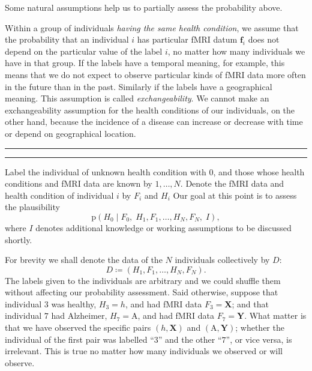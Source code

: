 \documentclass[\ifafour a4paper,12pt,\else a5paper,10pt,\fi%
onecolumn,oneside,article,%
british%
]{memoir}
\theoremstyle{remark}
\theoremstyle{innote}
\newcommand*{\defd}{\coloneqq}
\newcommand*{\pf}{\mathrm{p}}%
\renewcommand*{\|}{\mathpunct{|}}
\newcommand*{\sect}{\S}%
\newcommand*{\yH}{H}
\newcommand*{\yh}{h}
\newcommand*{\yD}{D}
\newcommand*{\yF}{F}
\newcommand*{\yf}{\bm{f}}
\newcommand*{\ya}{\mathrm{A}}
\newcommand*{\yI}{I}
\theoremstyle{plain}
\begin{document}
Some natural assumptions help us to partially assess the probability above.

Within a group of individuals \emph{having the same health condition}, we
assume that the probability that an individual $i$ has particular fMRI
datum $\yf_i$ does not depend on the particular value of the label $i$, no
matter how many individuals we have in that group. If the labels have a
temporal meaning, for example, this means that we do not expect to observe
particular kinds of fMRI data more often in the future than in the past.
Similarly if the labels have a geographical meaning. This assumption is
called \emph{exchangeability}. We cannot make an exchangeability assumption
for the health conditions of our individuals, on the other hand, because
the incidence of a disease can increase or decrease with time or depend on
geographical location.

\parencites[\sect~3]{diaconisetal1990}[\sect~4.6]{bernardoetal1994_r2000}

\bigskip\hrule\par\smallskip\par\hrule\bigskip

Label the individual of unknown health condition with $0$, and those whose
health conditions and fMRI data are known by $1, \dotsc, N$. Denote the
fMRI data and health condition of individual $i$ by $\yF_i$ and $\yH_i$ Our
goal at this point is to assess the plausibility
\begin{equation}
  \label{eq:goal_1st_simple}
  \pf(\yH_0 \| \yF_0,\; \yH_1,\yF_1, \dotsc, \yH_N, \yF_N,\; \yI),
\end{equation}
where $\yI$ denotes additional knowledge or working assumptions to be
discussed shortly.

For brevity we shall denote the data of the $N$
individuals collectively by $\yD$:
\begin{equation}
  \label{eq:collective_data_D}
  D \defd (\yH_1,\yF_1, \dotsc, \yH_N, \yF_N).
\end{equation}
The labels given to the individuals are arbitrary and we could shuffle them
without affecting our probability assessment. Said otherwise, suppose that
individual $3$ was healthy, $\yH_3=\yh$, and had fMRI data $\yF_3=\bm{X}$;
and that individual $7$ had Alzheimer, $\yH_7=\ya$, and had fMRI data
$\yF_7=\bm{Y}$. What matter is that we have observed the specific pairs
$(\yh,\bm{X})$ and $(\ya,\bm{Y})$; whether the individual of the first pair
was labelled \enquote{$3$} and the other \enquote{$7$}, or vice versa, is
irrelevant. This is true no matter how many individuals we observed or will
observe.
\end{document}
